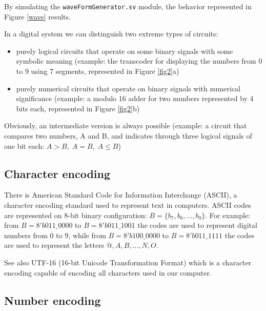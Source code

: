 By simulating the {\tt waveFormGenerator.sv} module, the behavior represented in Figure \ref{wave} results.





In a digital system we can distinguish two extreme types of circuits:
\begin{itemize}
\item purely logical circuits that operate on some binary signals with some symbolic meaning (example: the transcoder for displaying the numbers from 0 to 9 using 7 segments, represented in Figure \ref{fig2}a)

\item purely numerical circuits that operate on binary signals with numerical significance (example: a modulo 16 adder for two numbers represented by 4 bits each, represented in Figure \ref{fig2}b)
\end{itemize}
Obviously, an intermediate version is always possible (example: a circuit that compares two numbers, A and B, and indicates through three logical signals of one bit each: $A>B, \; A=B, \; A\leq B$)


\subsection{Character encoding}

There is American Standard Code for Information Interchange (ASCII),  a character encoding standard used to represent text in computers.
ASCII codes are represented on 8-bit binary configuration: $B = \{b_7, b_6, \ldots, b_0\}$. For example: from $B = 8'b011\_0000$ to $B = 8'b011\_1001$ the codes are used to represent digital numbers from 0 to 9, while from $B = 8'b100\_0000$ to $B = 8'b011\_1111$ the codes are used to represent the letters $@, A, B, \ldots, N, O$.

See also UTF-16 (16-bit Unicode Transformation Format) which is a character encoding capable of encoding all characters  used in our computer.

\subsection{Number encoding}

